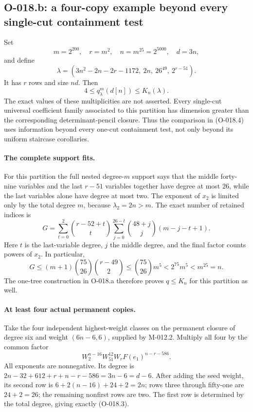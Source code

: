 \subsection{O-018.b: a four-copy example beyond every single-cut containment test}
Set
\[
 m=2^{200},\quad r=m^2,\quad n=m^{25}=2^{5000},\quad d=3n,
\]
and define
\[
 \lambda=(3n^2-2n-2r-1172,\ 2n,\ 26^{49},\ 2^{r-51}).
                                                               \tag{O-018.3}
\]
It has $r$ rows and size $nd$. Then
\[
                              4\leq q^m_\lambda(d[n])
                                              \leq K_n(\lambda).
                                                               \tag{O-018.4}
\]
The exact values of these multiplicities are not asserted.
Every single-cut universal coefficient family associated to
this partition has dimension greater than the corresponding
determinant-pencil closure. Thus the comparison in (O-018.4)
uses information beyond every one-cut containment test, not
only beyond its uniform staircase corollaries.

\paragraph{The complete support fits.}
For this partition the full nested degree-$m$ support says
that the middle forty-nine variables and the last $r-51$
variables together have degree at most $26$, while the
last variables alone have degree at most two. The exponent
of $x_2$ is limited only by the total degree $m$, because
$\lambda_2=2n>m$.
The exact number of retained indices is
\[
 G=\sum_{t=0}^2\binom{r-52+t}{t}
       \sum_{j=0}^{26-t}\binom{48+j}{j}(m-j-t+1).
                                                               \tag{O-018.5}
\]
Here $t$ is the last-variable degree, $j$ the middle degree,
and the final factor counts powers of $x_2$.
In particular,
\[
 G\leq(m+1)\binom{75}{26}\binom{r-49}{2}
          \leq\binom{75}{26}m^5<2^{75}m^5<m^{25}=n.
\]
The one-tree construction in O-018.a therefore proves
$q\leq K_n$ for this partition as well.

\paragraph{At least four actual permanent copies.}
Take the four independent highest-weight classes on the
permanent closure of degree six and weight $(6n-6,6)$,
supplied by M-012.2. Multiply all four by the common factor
\[
                   W_2^{n-16}W_{51}^{12}W_r
                                       F(e_1)^{n-r-586}.        \tag{O-018.6}
\]
All exponents are nonnegative. Its degree is
$2n-32+612+r+n-r-586=3n-6=d-6$.
After adding the seed weight, its second row is
$6+2(n-16)+24+2=2n$; rows three through fifty-one
are $24+2=26$; the remaining nonfirst rows are two.
The first row is determined by the total degree, giving
exactly (O-018.3).

